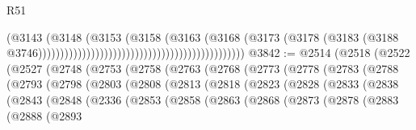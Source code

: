 \begin{lexlean}{R51}
\begin{coremodule}
                                                                              (@3143
                                                                                (@3148
                                                                                  (@3153
                                                                                    (@3158
                                                                                      (@3163
                                                                                        (@3168
                                                                                          (@3173
                                                                                            (@3178
                                                                                              (@3183
                                                                                                (@3188
                                                                                                  @3746)))))))))))))))))))))))))))))))))))))))))))))))
@3842 := @2514
    (@2518
      (@2522
        (@2527
          (@2748
            (@2753
              (@2758
                (@2763
                  (@2768
                    (@2773
                      (@2778
                        (@2783
                          (@2788
                            (@2793
                              (@2798
                                (@2803
                                  (@2808
                                    (@2813
                                      (@2818
                                        (@2823
                                          (@2828
                                            (@2833
                                              (@2838
                                                (@2843
                                                  (@2848
                                                    (@2336
                                                      (@2853
                                                        (@2858
                                                          (@2863
                                                            (@2868
                                                              (@2873
                                                                (@2878
                                                                  (@2883
                                                                    (@2888
                                                                      (@2893

\end{coremodule}
\end{lexlean}
